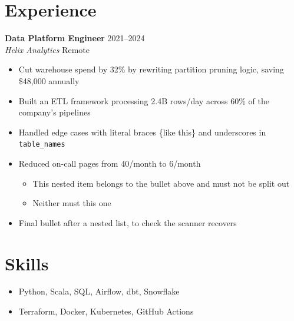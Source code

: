 \documentclass[a4paper,10pt]{article}
\begin{document}
\section{Experience}

\textbf{Data Platform Engineer} \hfill 2021--2024 \\
\textit{Helix Analytics} \hfill Remote

\begin{itemize}[leftmargin=*]
  \item Cut warehouse spend by 32\% by rewriting partition pruning logic, saving \$48{,}000 annually
  \item Built an ETL framework processing 2.4B rows/day across 60\% of the company's pipelines
  \item Handled edge cases with literal braces \{like this\} and underscores in \texttt{table\_names}
  \item Reduced on-call pages from 40/month to 6/month
        \begin{itemize}
          \item This nested item belongs to the bullet above and must not be split out
          \item Neither must this one
        \end{itemize}
  \item Final bullet after a nested list, to check the scanner recovers
\end{itemize}

\section{Skills}

\begin{itemize}[leftmargin=*]
  \item Python, Scala, SQL, Airflow, dbt, Snowflake
  \item Terraform, Docker, Kubernetes, GitHub Actions
\end{itemize}
\end{document}
